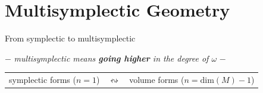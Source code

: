 \documentclass[handout,10pt]{beamer}
\begin{document}
\section{Multisymplectic Geometry}
\checkpoint	

\begin{frame}{From symplectic to {multi}symplectic} 
	\begin{center}
		$-$ \emph{multisymplectic means \textbf{going higher} in the degree of $\omega$} $-$
	\end{center}
	\pause
	\begin{defblock}
			
	\end{defblock}
	\pause
		\begin{table}
			\begin{tabular}{c c c}
				symplectic forms \small($n=1$) & $\leftrightsquigarrow$ & volume forms \small($n= \text{dim}(M)-1$)
			\end{tabular}
		\end{table}


\end{frame}
\end{document}

